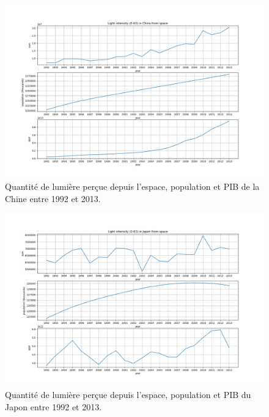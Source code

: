 \documentclass[a4paper, 11pt]{report}
\begin{document}
\begin{figure}
	\centering
	\includegraphics[width=1.0\textwidth]{img/sum_China.png}
	\caption{Quantité de lumière perçue depuis l'espace, population et PIB de la Chine entre 1992 et 2013.}
	\label{sum_China}
\end{figure}


\begin{figure}
	\centering
	\includegraphics[width=1.0\textwidth]{img/sum_Japan.png}
	\caption{Quantité de lumière perçue depuis l'espace, population et PIB du Japon entre 1992 et 2013.}
	\label{sum_Japan}
\end{figure}
\end{document}

